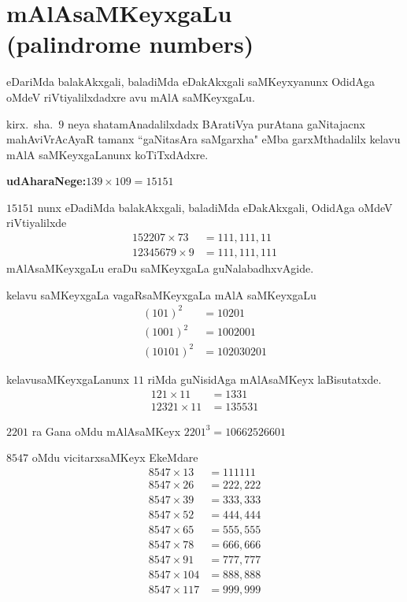 \chapter[mAlAsaMKeyxgaLu ({\rm\bfseries palindrome numbers})]{mAlAsaMKeyxgaLu\\ ({\rm\bfseries palindrome numbers})}
\vskip -20pt

eDariMda balakAkxgali, baladiMda eDakAkxgali saMKeyxyanunx OdidAga oMdeV riVti\-yalilxdadxre avu mAlA saMKeyxgaLu.

kirx.~sha.\ $9$ neya shatamAnadalilxdadx BAratiVya purAtana gaNitajacnx \-mahAviVrAcAyaR tamanx ``gaNitasAra saMgarxha" eMba garxMthadalilx kelavu mAlA saMKeyxgaLanunx koTiTxdAdxre.

\textbf{udAharaNege:}\qquad $139 \times 109 = 15151$

$15151$ nunx eDadiMda balakAkxgali, baladiMda eDakAkxgali, OdidAga oMdeV riVtiyalilxde
\begin{align*}
152207 \times 73 &= 111,111,11\\
12345679 \times 9 &= 111,111,111
\end{align*}
mAlAsaMKeyxgaLu eraDu saMKeyxgaLa guNalabadhxvAgide.

kelavu saMKeyxgaLa vagaRsaMKeyxgaLa mAlA saMKeyxgaLu
\begin{align*}
(101)^2 &= 10201\\
(1001)^2 &= 1002001\\
(10101)^2 &= 102030201
\end{align*}

kelavusaMKeyxgaLanunx $11$ riMda guNisidAga mAlAsaMKeyx laBisutatxde.
\begin{align*}
121 \times 11 &=1331 \\
12321 \times 11 &= 135531
\end{align*}

$2201$ ra Gana oMdu mAlAsaMKeyx $2201^3 =10662526601$

$8547$ oMdu vicitarxsaMKeyx EkeMdare
\begin{align*}
8547 \times 13 &= 111111\\
8547 \times 26  &= 222,222 \\
8547 \times 39  &= 333,333 \\
8547 \times 52  &= 444,444 \\
8547 \times 65  &= 555,555 \\
8547 \times 78  &= 666,666 \\
8547 \times 91  &= 777,777 \\
8547 \times 104 &= 888,888 \\
8547 \times 117 &= 999,999 
\end{align*}

